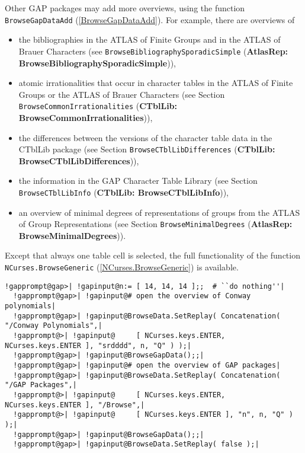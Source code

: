 \documentclass[a4paper,11pt]{report}
\begin{document}
{{{ Other \textsf{GAP} packages may add more overviews, using the function \texttt{BrowseGapDataAdd} (\ref{BrowseGapDataAdd}). For example, there are overviews of 
\begin{itemize}
\item  the bibliographies in the \textsf{ATLAS} of Finite Groups \cite{CCN85} and in the \textsf{ATLAS} of Brauer Characters \cite{JLPW95} (see \texttt{BrowseBibliographySporadicSimple} (\textbf{AtlasRep: BrowseBibliographySporadicSimple})), 
\item  atomic irrationalities that occur in character tables in the \textsf{ATLAS} of Finite Groups \cite{CCN85} or the \textsf{ATLAS} of Brauer Characters \cite{JLPW95} (see Section \texttt{BrowseCommonIrrationalities} (\textbf{CTblLib: BrowseCommonIrrationalities})), 
\item  the differences between the versions of the character table data in the \textsf{CTblLib} package (see Section \texttt{BrowseCTblLibDifferences} (\textbf{CTblLib: BrowseCTblLibDifferences})), 
\item  the information in the \textsf{GAP} Character Table Library (see Section \texttt{BrowseCTblLibInfo} (\textbf{CTblLib: BrowseCTblLibInfo})), 
\item  an overview of minimal degrees of representations of groups from the \textsf{ATLAS} of Group Representations (see Section \texttt{BrowseMinimalDegrees} (\textbf{AtlasRep: BrowseMinimalDegrees})). 
\end{itemize}
   

 Except that always one table cell is selected, the full functionality of the
function \texttt{NCurses.BrowseGeneric} (\ref{NCurses.BrowseGeneric}) is available. 

 
\begin{Verbatim}[commandchars=!@|,fontsize=\small,frame=single,label=Example]
  !gapprompt@gap>| !gapinput@n:= [ 14, 14, 14 ];;  # ``do nothing''|
  !gapprompt@gap>| !gapinput@# open the overview of Conway polynomials|
  !gapprompt@gap>| !gapinput@BrowseData.SetReplay( Concatenation( "/Conway Polynomials",|
  !gapprompt@>| !gapinput@     [ NCurses.keys.ENTER, NCurses.keys.ENTER ], "srdddd", n, "Q" ) );|
  !gapprompt@gap>| !gapinput@BrowseGapData();;|
  !gapprompt@gap>| !gapinput@# open the overview of GAP packages|
  !gapprompt@gap>| !gapinput@BrowseData.SetReplay( Concatenation( "/GAP Packages",|
  !gapprompt@>| !gapinput@     [ NCurses.keys.ENTER, NCurses.keys.ENTER ], "/Browse",|
  !gapprompt@>| !gapinput@     [ NCurses.keys.ENTER ], "n", n, "Q" ) );|
  !gapprompt@gap>| !gapinput@BrowseGapData();;|
  !gapprompt@gap>| !gapinput@BrowseData.SetReplay( false );|
\end{Verbatim}
 

}}}
\end{document}

